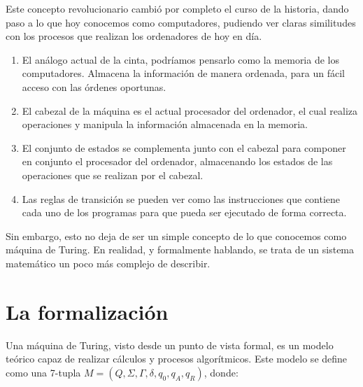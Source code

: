 Este concepto revolucionario cambió por completo el curso de la historia, dando paso a lo que hoy conocemos como computadores, pudiendo ver claras similitudes con los procesos que realizan los ordenadores 
de hoy en día. 
\begin{enumerate}
    \item El análogo actual de la cinta, podríamos pensarlo como la memoria de los computadores. Almacena la información de manera ordenada, para un fácil acceso con las órdenes oportunas.
    \item El cabezal de la máquina es el actual procesador del ordenador, el cual realiza operaciones y manipula la información almacenada en la memoria.
    \item El conjunto de estados se complementa junto con el cabezal para componer en conjunto el procesador del ordenador, almacenando los estados de las operaciones que se realizan por el cabezal.
    \item Las reglas de transición se pueden ver como las instrucciones que contiene cada uno de los programas para que pueda ser ejecutado de forma correcta. 
\end{enumerate}

Sin embargo, esto no deja de ser un simple concepto de lo que conocemos como máquina de Turing. En realidad, y formalmente hablando, se trata de un sistema matemático un poco más complejo de describir.

\section{La formalización}

Una máquina de Turing, visto desde un punto de vista formal, es un modelo teórico capaz de realizar cálculos y procesos algorítmicos. Este modelo se define como una 7-tupla $M = (Q, \Sigma, \Gamma, \delta, q_0, q_A, q_R)$,
donde:

